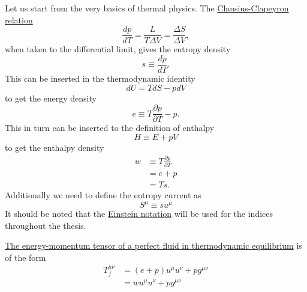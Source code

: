 Let us start from the very basics of thermal physics.
The
\href{https://en.wikipedia.org/wiki/Clausius\%E2\%80\%93Clapeyron_relation}{Clausius-Clapeyron relation}
\cite[eq. 5.47, 5.48]{schroeder_thermal_2000}
\begin{equation}
\frac{dp}{dT} = \frac{L}{T \Delta V} = \frac{\Delta S}{\Delta V},
\end{equation}
when taken to the differential limit, gives the entropy density
\cite[p. 23]{lecture_notes}
\begin{equation}
s \equiv \frac{dp}{dT}.
\end{equation}
This can be inserted in the thermodynamic identity
\cite[eq. 3.46]{schroeder_thermal_2000}
\begin{equation}
dU = TdS - pdV
\end{equation}
to get the energy density
\begin{equation}
e \equiv T \frac{\partial p}{\partial T} - p.
\end{equation}
This in turn can be inserted to the definition of enthalpy
\cite[eq. 1.51]{schroeder_thermal_2000}
\begin{equation}
H \equiv E + pV
\end{equation}
to get the enthalpy density
\begin{align}
w
&\equiv T \frac{\partial p}{\partial T} \\
&= e+p \\
&= Ts.
\end{align}
Additionally we need to define the entropy current as
\cite[p. 23]{lecture_notes}
\begin{equation}
S^\mu \equiv su^\mu
\end{equation}
It should be noted that the
\href{https://en.wikipedia.org/wiki/Einstein_notation}{Einstein notation} will be used for the indices throughout the thesis.

\href{https://en.wikipedia.org/wiki/Stress\%E2\%80\%93energy\_tensor\#Stress\%E2\%80\%93energy\_of\_a\_fluid\_in\_equilibrium}{The energy-momentum tensor of a perfect fluid in thermodynamic equilibrium}
is of the form
\cites[eq. 5.11, 5.23]{lecture_notes}[eq. 3]{giese_2020}[eq. 4]{giese_2021}
\begin{align}
T^{\mu \nu}_f
&= (e+p) u^\mu u^\nu + p g^{\mu \nu}
\label{eq:ep_tensor} \\
&= w u^\mu u^\nu + p g^{\mu \nu}
\end{align}


